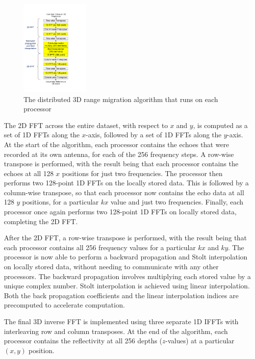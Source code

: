 \documentclass[twocolumn]{article}
\begin{document}
\begin{figure}[!h]
\centering
\includegraphics*[width=0.3\textwidth, viewport=10 70 430 750]{figures/algorithm_labeled.pdf}
\caption{The distributed 3D range migration algorithm that runs on each processor}
\label{algorithm_labeled}
\end{figure}

The 2D FFT across the entire dataset, with respect to $x$ and $y$, is computed as a set of 1D FFTs along the $x$-axis, followed by a set of 1D FFTs along the $y$-axis. At the start of the algorithm, each processor contains the echoes that were recorded at its own antenna, for each of the 256 frequency steps. A row-wise transpose is performed, with the result being that each processor contains the echoes at all 128 $x$ positions for just two frequencies. The processor then performs two 128-point 1D FFTs on the locally stored data. This is followed by a column-wise transpose, so that each processor now contains the echo data at all 128 $y$ positions, for a particular $kx$ value and just two frequencies. Finally, each processor once again performs two 128-point 1D FFTs on locally stored data, completing the 2D FFT.

After the 2D FFT, a row-wise transpose is performed, with the result being that each processor contains all 256 frequency values for a particular $kx$ and $ky$. The processor is now able to perform a backward propagation and Stolt interpolation on locally stored data, without needing to communicate with any other processors. The backward propagation involves multiplying each stored value by a unique complex number. Stolt interpolation is achieved using linear interpolation. Both the back propagation coefficients and the linear interpolation indices are precomputed to accelerate computation.

The final 3D inverse FFT is implemented using three separate 1D IFFTs with interleaving row and column transposes. At the end of the algorithm, each processor contains the reflectivity at all 256 depths ($z$-values) at a particular $(x,y)$ position.
\end{document}
